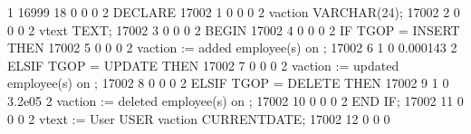 \documentclass[letterpaper,10pt,english,openany,oneside]{sphinxmanual}
\begin{document}
\begin{sphinxVerbatim}[commandchars=\\\{\}]
    1 \textbar{}                                                                  \textbar{}    16999 \textbar{}          18 \textbar{}          0 \textbar{}               0 \textbar{}          0
    2 \textbar{} DECLARE                                                          \textbar{}    17002 \textbar{}           1 \textbar{}          0 \textbar{}               0 \textbar{}          0
    2 \textbar{}     v\PYGZus{}action        VARCHAR(24);                                 \textbar{}    17002 \textbar{}           2 \textbar{}          0 \textbar{}               0 \textbar{}          0
    2 \textbar{}     v\PYGZus{}text          TEXT;                                        \textbar{}    17002 \textbar{}           3 \textbar{}          0 \textbar{}               0 \textbar{}          0
    2 \textbar{} BEGIN                                                            \textbar{}    17002 \textbar{}           4 \textbar{}          0 \textbar{}               0 \textbar{}          0
    2 \textbar{}     IF TG\PYGZus{}OP = \PYGZsq{}INSERT\PYGZsq{} THEN                                     \textbar{}    17002 \textbar{}           5 \textbar{}          0 \textbar{}               0 \textbar{}          0
    2 \textbar{}         v\PYGZus{}action := \PYGZsq{} added employee(s) on \PYGZsq{};                    \textbar{}    17002 \textbar{}           6 \textbar{}          1 \textbar{}               0 \textbar{}   0.000143
    2 \textbar{}     ELSIF TG\PYGZus{}OP = \PYGZsq{}UPDATE\PYGZsq{} THEN                                  \textbar{}    17002 \textbar{}           7 \textbar{}          0 \textbar{}               0 \textbar{}          0
    2 \textbar{}         v\PYGZus{}action := \PYGZsq{} updated employee(s) on \PYGZsq{};                  \textbar{}    17002 \textbar{}           8 \textbar{}          0 \textbar{}               0 \textbar{}          0
    2 \textbar{}     ELSIF TG\PYGZus{}OP = \PYGZsq{}DELETE\PYGZsq{} THEN                                  \textbar{}    17002 \textbar{}           9 \textbar{}          1 \textbar{}               0 \textbar{}    3.2e\PYGZhy{}05
    2 \textbar{}         v\PYGZus{}action := \PYGZsq{} deleted employee(s) on \PYGZsq{};                  \textbar{}    17002 \textbar{}          10 \textbar{}          0 \textbar{}               0 \textbar{}          0
    2 \textbar{}     END IF;                                                      \textbar{}    17002 \textbar{}          11 \textbar{}          0 \textbar{}               0 \textbar{}          0
    2 \textbar{}     v\PYGZus{}text := \PYGZsq{}User \PYGZsq{} \textbar{}\textbar{} USER \textbar{}\textbar{} v\PYGZus{}action \textbar{}\textbar{} CURRENT\PYGZus{}DATE;       \textbar{}    17002 \textbar{}          12 \textbar{}          0 \textbar{}               0 \textbar{}          0

\end{sphinxVerbatim}
\end{document}
